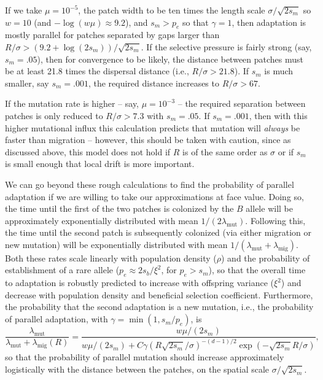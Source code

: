 \documentclass[10pt,letterpaper]{article}
\newcommand{\migrate}{\lambda_\text{mig}}
\newcommand{\mutrate}{\lambda_\text{mut}}
\begin{document}

If we take 
$\mu=10^{-5}$,
the patch width to be ten times the length scale $\sigma/\sqrt{2s_m}$
so $w=10$ (and $-\log(w\mu)\approx 9.2$),
and $s_m>p_e$ so that $\gamma=1$,
then adaptation is mostly parallel for patches separated by gaps larger than $R/\sigma > (9.2+\log(2s_m))/\sqrt{2s_m}$.
If the selective pressure is fairly strong (say, $s_m=.05$),
then for convergence to be likely,
the distance between patches must be at least 21.8 times the dispersal distance (i.e., $R/\sigma > 21.8$).
If $s_m$ is much smaller, say $s_m = .001$, 
the required distance increases to $R/\sigma > 67$.

If the mutation rate is higher -- say, $\mu=10^{-3}$ --
the required separation between patches is only reduced to $R/\sigma > 7.3$ with $s_m=.05$.
If $s_m=.001$, then with this higher mutational influx this calculation predicts that mutation will \emph{always} be faster than migration
-- however, this should be taken with caution,
since as discussed above, this model does not hold if $R$ is of the same order as $\sigma$
or if $s_m$ is small enough that local drift is more important.

We can go beyond these rough calculations to find
the probability of parallel adaptation if we are willing to take our approximations at face value. 
Doing so, the time until the first of the two patches is colonized by the $B$
allele will be approximately exponentially distributed with mean $1/(2
\mutrate)$.
Following this, the time until the second patch is subsequently colonized 
(via either migration or new mutation) 
will be exponentially distributed with mean $1/(\mutrate+\migrate)$.
Both these rates scale linearly with population density ($\rho$) 
and the probability of establishment of a rare allele ($p_e\approx 2 s_b/\xi^2$, for $p_e>s_m$),
so that the overall time to adaptation is robustly predicted to increase with offspring variance ($\xi^2$)
and decrease with population density and beneficial selection coefficient.
Furthermore, the probability that the second adaptation is a new mutation,
i.e., the probability of parallel adaptation, 
with $\gamma = \min(1,s_m/p_e)$,
is 
\begin{equation} \label{eqn:parallel_prob}
    \frac{\mutrate}{\mutrate+\migrate(R)} = \frac{ w \mu / (2s_m) }{ w \mu / (2s_m) + C \gamma \left(R \sqrt{2 s_m} /\sigma \right)^{-(d-1)/2}\exp\left(- \sqrt{2 s_m} R / \sigma \right) },  
\end{equation}
so that the probability of parallel mutation should increase
approximately logistically with the distance between the patches, on the spatial scale $\sigma/\sqrt{2 s_m}$. 
\end{document}
